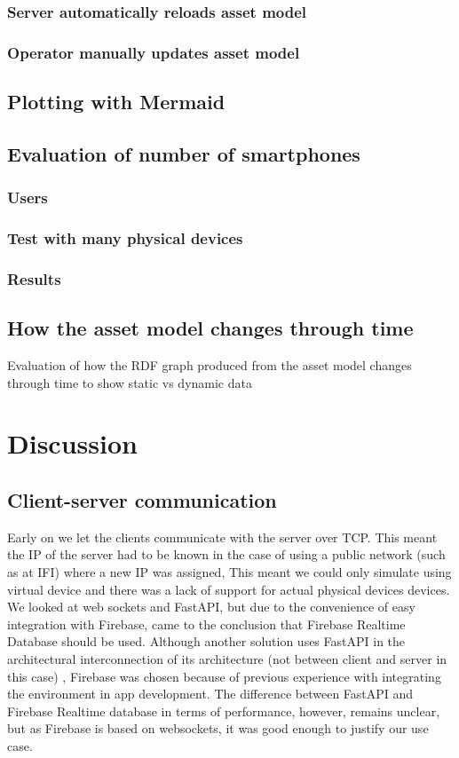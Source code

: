 \documentclass{article}
\begin{document}
\subsubsection{Server automatically reloads asset model}
\subsubsection{Operator manually updates asset model}
\subsection{Plotting with Mermaid}
\subsection{Evaluation of number of smartphones}
\subsubsection{Users}
\subsubsection{Test with many physical devices}
\subsubsection{Results}
\subsection{How the asset model changes through time}
Evaluation of how the RDF graph produced from the asset model changes through time to show static vs dynamic data




\newpage
\section{Discussion}\label{sec:Discussion}
\subsection{Client-server communication}\label{subsec:ClientServerCommunication}
Early on we let the clients communicate with the server over TCP. This meant the IP of the server had to be known in the case of using a public network (such as at IFI) where a new IP was assigned, This meant we could only simulate using virtual device and there was a lack of support for actual physical devices devices. We looked at web sockets and FastAPI, but due to the convenience of easy integration with Firebase, came to the conclusion that Firebase Realtime Database should be used. Although another solution uses FastAPI in the architectural interconnection of its architecture (not between client and server in this case) \cite{waszak_let_2022}, Firebase was chosen because of previous experience with integrating the environment in app development. The difference between FastAPI and Firebase Realtime database in terms of performance, however, remains unclear, but as Firebase is based on websockets, it was good enough to justify our use case.
\end{document}

